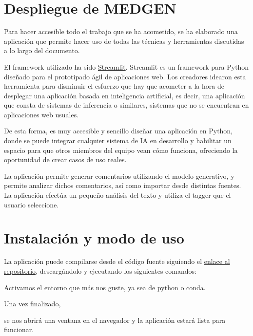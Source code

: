 \section{Despliegue de MEDGEN}

Para hacer accesible todo el trabajo que se ha acometido, se ha elaborado una aplicación que permite hacer uso de todas las técnicas y herramientas discutidas a lo largo del documento. 

El framework utilizado ha sido \href{https://streamlit.io}{Streamlit}. Streamlit es un framework para Python diseñado para el prototipado ágil de aplicaciones web. Los creadores idearon esta herramienta para disminuir el esfuerzo que hay que acometer a la hora de desplegar una aplicación basada en inteligencia artificial, es decir, una aplicación que consta de sistemas de inferencia o similares, sistemas que no se encuentran en aplicaciones web usuales. 

De esta forma, es muy accesible y sencillo diseñar una aplicación en Python, donde se puede integrar cualquier sistema de IA en desarrollo y habilitar un espacio para que otros miembros del equipo vean cómo funciona, ofreciendo la oportunidad de crear casos de uso reales.

La aplicación permite generar comentarios utilizando el modelo generativo, y permite analizar dichos comentarios, así como importar desde distintas fuentes. La aplicación efectúa un pequeño análisis del texto y utiliza el tagger que el usuario seleccione.


\section{Instalación y modo de uso}
La aplicación puede compilarse desde el código fuente siguiendo el \href{https://github.com/jesi-rgb/medical-text-analysis}{enlace al repositorio}, descargándolo y ejecutando los siguientes comandos:


Activamos el entorno que más nos guste, ya sea de python o conda.



Una vez finalizado, 


se nos abrirá una ventana en el navegador y la aplicación estará lista para funcionar.


